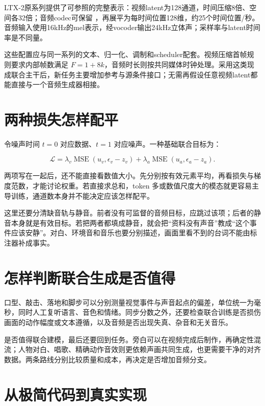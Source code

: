 LTX-2原系列提供了可参照的完整表示：视频latent为128通道，时间压缩8倍、空间各32倍；音频codec可保留 ，再展平为每时间位置128维，约25个时间位置/秒。音频输入使用16kHz的mel表示，经vocoder输出24kHz立体声；采样率与latent时间率是不同量。

这些配置应与同一系列的文本、归一化、调制和scheduler配套。视频压缩首帧规则要求内部帧数满足 \(F=1+8k\)，音频时长则按共同媒体时钟处理。采用这类现成联合主干后，新任务主要增加参考与源条件接口；无需再假设任意视频latent都能直接与一个音频生成器相接。

\section{两种损失怎样配平}\label{seedance-m05-ux4e24ux79cdux635fux5931ux600eux6837ux914dux5e73}

令噪声时间 \(t=0\) 对应数据、\(t=1\) 对应噪声。一种基础联合目标为：

\[
\mathcal{L}=\lambda_v\operatorname{MSE}(u_v,\epsilon_v-z_v)
+\lambda_a\operatorname{MSE}(u_a,\epsilon_a-z_a).
\]

两项写在一起后，还不能直接看数值大小。先分别按有效元素平均，再看损失与梯度范数，才能讨论权重。若直接求总和，token 多或数值尺度大的模态就更容易主导训练，通道数本身并不能决定应该怎样配平。

这里还要分清缺音轨与静音。前者没有可监督的音频目标，应跳过该项；后者的静音本身就是有效目标。若把两者都填成静音，就会把“资料没有声音”教成“这个事件应该安静”。对白、环境音和音乐也要分别描述，画面里看不到的台词不能由标注器补成事实。

\section{怎样判断联合生成是否值得}\label{seedance-m05-ux600eux6837ux5224ux65adux8054ux5408ux751fux6210ux662fux5426ux503cux5f97}

口型、敲击、落地和脚步可以分别测量视觉事件与声音起点的偏差，单位统一为毫秒，同时人工复听语言、音色和情绪。同步分数之外，还要检查联合训练是否损伤画面的动作幅度或文本遵循，以及音频是否出现失真、杂音和无关音乐。

是否值得联合建模，最后还要回到任务。旁白可以在视频完成后制作，再确定性混流；人物对白、唱歌、精确动作音效则更依赖声画共同生成，也更需要干净的对齐数据。两条路线分别比较质量和成本，再决定是否增加音频分支。

\section{从极简代码到真实实现}\label{seedance-m05-ux4eceux6781ux7b80ux4ee3ux7801ux5230ux771fux5b9eux5b9eux73b0}

